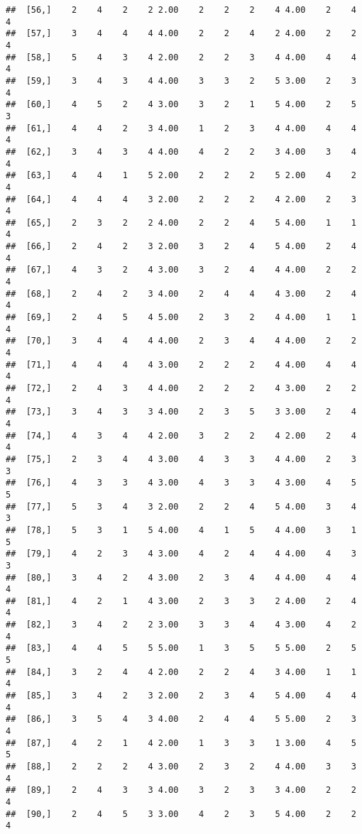 \documentclass[]{article}
\begin{document}
\begin{verbatim}
##  [56,]    2    4    2    2 2.00    2    2    2    4 4.00    2    4    4
##  [57,]    3    4    4    4 4.00    2    2    4    2 4.00    2    2    4
##  [58,]    5    4    3    4 2.00    2    2    3    4 4.00    4    4    4
##  [59,]    3    4    3    4 4.00    3    3    2    5 3.00    2    3    4
##  [60,]    4    5    2    4 3.00    3    2    1    5 4.00    2    5    3
##  [61,]    4    4    2    3 4.00    1    2    3    4 4.00    4    4    4
##  [62,]    3    4    3    4 4.00    4    2    2    3 4.00    3    4    4
##  [63,]    4    4    1    5 2.00    2    2    2    5 2.00    4    2    4
##  [64,]    4    4    4    3 2.00    2    2    2    4 2.00    2    3    4
##  [65,]    2    3    2    2 4.00    2    2    4    5 4.00    1    1    4
##  [66,]    2    4    2    3 2.00    3    2    4    5 4.00    2    4    4
##  [67,]    4    3    2    4 3.00    3    2    4    4 4.00    2    2    4
##  [68,]    2    4    2    3 4.00    2    4    4    4 3.00    2    4    4
##  [69,]    2    4    5    4 5.00    2    3    2    4 4.00    1    1    4
##  [70,]    3    4    4    4 4.00    2    3    4    4 4.00    2    2    4
##  [71,]    4    4    4    4 3.00    2    2    2    4 4.00    4    4    4
##  [72,]    2    4    3    4 4.00    2    2    2    4 3.00    2    2    4
##  [73,]    3    4    3    3 4.00    2    3    5    3 3.00    2    4    4
##  [74,]    4    3    4    4 2.00    3    2    2    4 2.00    2    4    4
##  [75,]    2    3    4    4 3.00    4    3    3    4 4.00    2    3    3
##  [76,]    4    3    3    4 3.00    4    3    3    4 3.00    4    5    5
##  [77,]    5    3    4    3 2.00    2    2    4    5 4.00    3    4    3
##  [78,]    5    3    1    5 4.00    4    1    5    4 4.00    3    1    5
##  [79,]    4    2    3    4 3.00    4    2    4    4 4.00    4    3    3
##  [80,]    3    4    2    4 3.00    2    3    4    4 4.00    4    4    4
##  [81,]    4    2    1    4 3.00    2    3    3    2 4.00    2    4    4
##  [82,]    3    4    2    2 3.00    3    3    4    4 3.00    4    2    4
##  [83,]    4    4    5    5 5.00    1    3    5    5 5.00    2    5    5
##  [84,]    3    2    4    4 2.00    2    2    4    3 4.00    1    1    4
##  [85,]    3    4    2    3 2.00    2    3    4    5 4.00    4    4    4
##  [86,]    3    5    4    3 4.00    2    4    4    5 5.00    2    3    4
##  [87,]    4    2    1    4 2.00    1    3    3    1 3.00    4    5    5
##  [88,]    2    2    2    4 3.00    2    3    2    4 4.00    3    3    4
##  [89,]    2    4    3    3 4.00    3    2    3    3 4.00    2    2    4
##  [90,]    2    4    5    3 3.00    4    2    3    5 4.00    2    2    4

\end{verbatim}
\end{document}
